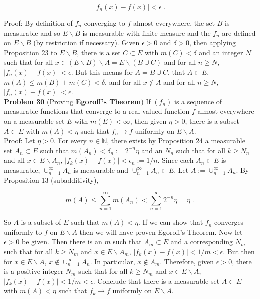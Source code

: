 \documentclass[a4paper]{article}
\begin{document}
$$|f_n(x) - f(x)| < \epsilon \;.$$

Proof: By definition of $f_n$ converging to $f$ almost everywhere, the set $B$ is measurable and so $E\backslash B$ is measurable with finite measure and the $f_n$ are defined on $E \backslash B$ (by restriction if necessary). Given $\epsilon> 0$ and $\delta > 0$, then applying Proposition 23 to $E \backslash B$, there is a set $C\subset E$ with $m(C) < \delta$ and an integer $N$ such that for all $x \in (E\backslash B) \backslash A = E \backslash (B \cup C)$ and for all $n \geq N$, $|f_n(x) - f(x)| < \epsilon$. But this means for $A = B\cup C$, that $A\subset E$, $m(A) \leq m(B) + m(C) < \delta$, and for all $x \not\in A$ and for all $n\geq N$, $|f_n(x) - f(x)| < \epsilon$. \\

{\bf Problem 30} (Proving {\bf Egoroff's Theorem}) If $(f_n)$ is a sequence of measurable functions that converge to a real-valued function $f$ almost everywhere on a measurable set $E$ with $m(E) < \infty$, then given $\eta > 0$, there is a subset $A \subset E$ with $m(A) < \eta$ such that $f_n \rightarrow f$ uniformly on $E\backslash A$. \\

Proof:  Let $\eta > 0$. For every $n \in \mathbb{N}$, there exists by Proposition 24 a measurable set $A_n \subset E$ such that $m(A_n) < \delta_n:= 2^{-n}\eta$ and an $N_n$ such that for all $k \geq N_n$ and all $x \in E\backslash A_n$, $|f_k(x) - f(x)| < \epsilon_n := 1/n$. Since each $A_n\subset E$ is measurable, $\cup_{n=1}^\infty A_n$ is measurable and $\cup_{n=1}^\infty A_n \subset E$. Let $A:= \cup_{n=1}^\infty A_n$. By Proposition 13 (subadditivity), 

$$m(A) \leq \sum_{n=1}^\infty m(A_n) < \sum_{n=1}^\infty 2^{-n}\eta = \eta \;.$$

So $A$ is a subset of $E$ such that $m(A) < \eta$. If we can show that $f_n$ converges uniformly to $f$ on $E \backslash A$ then we will have proven Egoroff's Theorem. Now let $\epsilon > 0$ be given. Then there is an $m$ such that $A_m \subset E$ and a corresponding $N_m$ such that for all $k\geq N_m$ and $x \in E\backslash A_m$, $|f_k(x) - f(x)| < 1/m < \epsilon$. But then for $x \in E\backslash A$, $x \not\in \cup_{n=1}^\infty A_n$. In particular, $x \not\in A_m$. Therefore, given $\epsilon > 0$, there is a positive integer $N_m$ such that for all $k\geq N_m$ and $x \in E\backslash A$, $|f_k(x) - f(x)| < 1/m < \epsilon$. Conclude that there is a measurable set $A\subset E$ with $m(A) < \eta$ such that $f_k \rightarrow f$ uniformly on $E\backslash A$.\\
\end{document}
